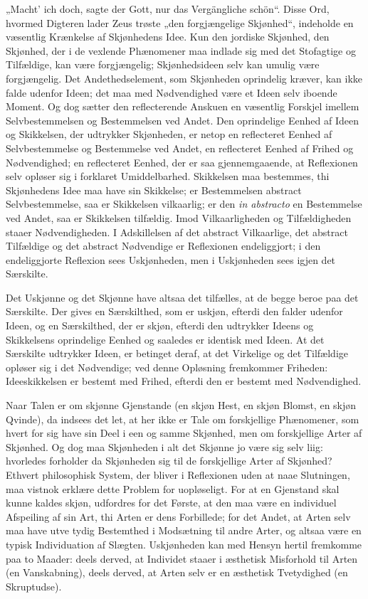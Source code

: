\documentclass[12pt]{book}
\newcommand{\opage}[1]{\marginnote{\footnotesize\textit{[#1]}}}
\begin{document}
„Macht' ich doch, sagte der Gott, nur das Vergängliche schön“. Disse Ord, hvormed Digteren lader Zeus trøste „den forgjængelige Skjønhed“, indeholde en væsentlig Krænkelse af Skjønhedens Idee. Kun den jordiske Skjønhed, den Skjønhed, der i de vexlende Phænomener maa indlade sig med det Stofagtige og Tilfældige, kan være forgjængelig; Skjønhedsideen selv kan umulig være forgjængelig. Det Andethedselement, som Skjønheden oprindelig kræver, kan ikke falde udenfor Ideen; det maa med Nødvendighed være et Ideen selv iboende Moment. Og dog sætter den reflecterende Anskuen en væsentlig Forskjel imellem Selvbestemmelsen og Bestemmelsen ved Andet. Den oprindelige Eenhed af Ideen og Skikkelsen, der udtrykker Skjønheden, er netop en reflecteret
\opage{378}Eenhed af Selvbestemmelse og Bestemmelse ved Andet, en reflecteret Eenhed af Frihed og Nødvendighed; en reflecteret Eenhed, der er saa gjennemgaaende, at Reflexionen selv opløser sig i forklaret Umiddelbarhed. Skikkelsen maa bestemmes, thi Skjønhedens Idee maa have sin Skikkelse; er Bestemmelsen abstract Selvbestemmelse, saa er Skikkelsen vilkaarlig; er den \textit{in abstracto} en Bestemmelse ved Andet, saa er Skikkelsen tilfældig. Imod Vilkaarligheden og Tilfældigheden staaer Nødvendigheden. I Adskillelsen af det abstract Vilkaarlige, det abstract Tilfældige og det abstract Nødvendige er Reflexionen endeliggjort; i den endeliggjorte Reflexion sees Uskjønheden, men i Uskjønheden sees igjen det Særskilte.

Det Uskjønne og det Skjønne have altsaa det tilfælles, at de begge beroe paa det Særskilte. Der gives en Særskilthed, som er uskjøn, efterdi den falder udenfor Ideen, og en Særskilthed, der er skjøn, efterdi den udtrykker Ideens og Skikkelsens oprindelige Eenhed og saaledes er identisk med Ideen. At det Særskilte udtrykker Ideen, er betinget deraf, at det Virkelige og det Tilfældige opløser sig i det Nødvendige; ved denne Opløsning fremkommer Friheden: Ideeskikkelsen er bestemt med Frihed, efterdi den er bestemt med Nødvendighed.

Naar Talen er om skjønne Gjenstande (en skjøn Hest, en skjøn Blomst, en skjøn Qvinde), da indsees det let, at her ikke er Tale om forskjellige Phænomener, som hvert for sig have sin Deel i een og samme Skjønhed, men om forskjellige Arter af Skjønhed. Og dog maa Skjønheden i alt det Skjønne jo være sig selv liig: hvorledes forholder da Skjønheden sig til de forskjellige Arter af Skjønhed? Ethvert philosophisk System, der bliver i Reflexionen uden at naae Slutningen, maa vistnok erklære dette Problem for uopløseligt. For at en Gjenstand skal kunne kaldes skjøn, udfordres for det Første, at den maa være en individuel Afspeiling af sin Art, thi Arten er dens Forbillede; for det Andet, at Arten selv maa have utve%
\opage{379}tydig Bestemthed i Modsætning til andre Arter, og altsaa være en typisk Individuation af Slægten. Uskjønheden kan med Hensyn hertil fremkomme paa to Maader: deels derved, at Individet staaer i æsthetisk Misforhold til Arten (en Vanskabning), deels derved, at Arten selv er en æsthetisk Tvetydighed (en Skruptudse).
\end{document}
